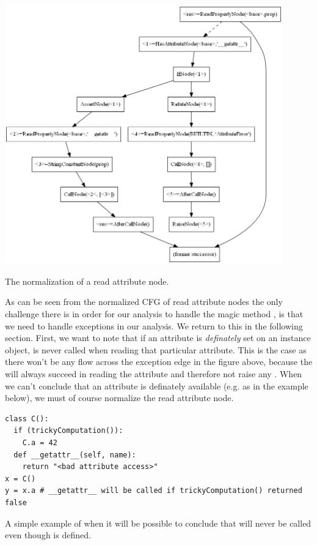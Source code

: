 \begin{listing}[H]
	\begin{center}
		\includegraphics[width=0.9\textwidth]{images/readproperty.png}
	\end{center}
	\vspace{-10pt}
	\caption{The normalization of a read attribute node.}
	\label{fig:MagicMethods1}
\end{listing}

As can be seen from the normalized CFG of read attribute nodes the only challenge there is in order for our analysis to handle the magic method , is that we need to handle exceptions in our analysis. We return to this in the following section. First, we want to note that if an attribute is \textit{definately} set on an instance object,  is never called when reading that particular attribute. This is the case as there won't be any flow across the exception edge in the figure above, because the  will always succeed in reading the attribute and therefore not raise any . When we can't conclude that an attribute is definately available (e.g. as in the example below), we must of course normalize the read attribute node.

\begin{listing}[H]
	\begin{verbatim}
class C():
  if (trickyComputation()):
    C.a = 42
  def __getattr__(self, name):
    return "<bad attribute access>"
x = C()
y = x.a # __getattr__ will be called if trickyComputation() returned false
	\end{verbatim}
	\caption{A simple example of when it will be possible to conclude that  will never be called even though  is defined.}
	\label{code:MagicMethods2}
\end{listing}

